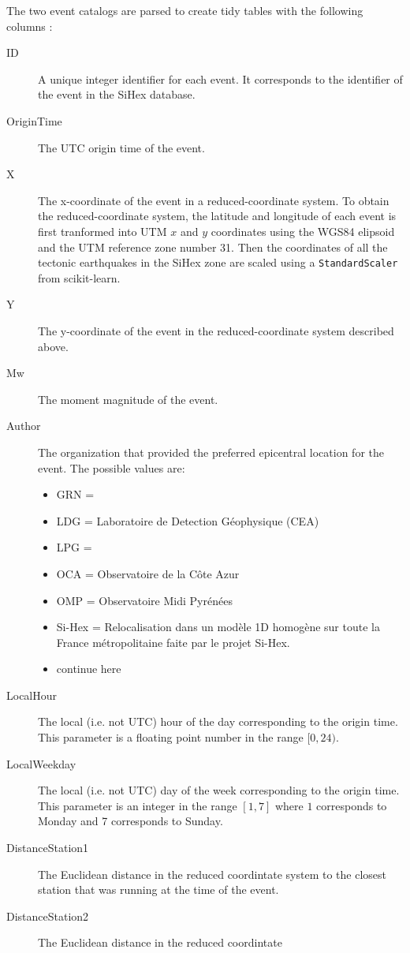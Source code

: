 The two event catalogs are parsed to create tidy tables with the following
columns :
\begin{description}
\item[ID] A unique integer identifier for each event. It corresponds to the
identifier of the event in the SiHex database.
\item[OriginTime] The UTC origin time of the event.
\item[X] The x-coordinate of the event in a reduced-coordinate system. To
obtain the reduced-coordinate system, the latitude and longitude of each event
is first tranformed into UTM $x$ and $y$ coordinates using the WGS84 elipsoid
and the UTM reference zone number 31. Then the coordinates of all the tectonic
earthquakes in the SiHex zone are scaled using a {\tt StandardScaler} from
{scikit-learn}.
\item[Y] The y-coordinate of the event in the reduced-coordinate system
described above.
\item[Mw] The moment magnitude of the event.
\item[Author] The organization that provided the preferred epicentral location
for the event. The possible values are:
\begin{itemize}
\item GRN = 
\item LDG = Laboratoire de Detection Géophysique (CEA)
\item LPG = 
\item OCA = Observatoire de la Côte Azur
\item OMP = Observatoire Midi Pyrénées
\item Si-Hex = Relocalisation dans un modèle 1D homogène sur toute la France
métropolitaine faite par le projet Si-Hex.
\item continue here
\end{itemize}
\item[LocalHour] The local (i.e. not UTC) hour of the day corresponding to the
origin time. This parameter is a floating point number in the range $[0, 24)$.
\item[LocalWeekday] The local (i.e. not UTC) day of the week corresponding to
the origin time. This parameter is an integer in the range $[1, 7]$ where $1$
corresponds to Monday and 7 corresponds to Sunday.
\item[DistanceStation1] The Euclidean distance in the reduced coordintate
system to the closest station that was running at the time of the event. 
\item[DistanceStation2] The Euclidean distance in the reduced coordintate

\end{description}
